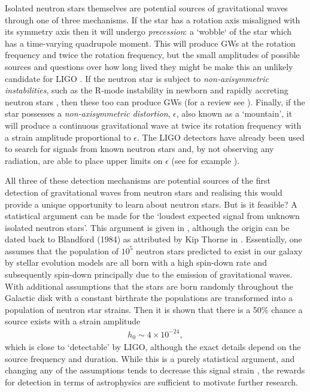 Isolated neutron stars themselves are potential sources of gravitational waves
through one of three mechanisms. If the star has a rotation axis misaligned
with its symmetry axis then it will undergo \emph{precession}: a `wobble` of
the star which has a time-varying quadrupole moment. This will produce GWs at
the rotation frequency and twice the rotation frequency, but the small
amplitudes of possible sources and questions over how long lived they might be
make this an unlikely candidate for LIGO \citep{Jones2002}. If the neutron star
is subject to \emph{non-axisymmetric instabilities}, such as the R-mode
instability in newborn and rapidly accreting neutron stars
\citep{andersson2001r}, then these too can produce GWs (for a review see
\citet{andersson2003gravitational}).  Finally, if the star possesses a
\emph{non-axisymmetric distortion}, $\epsilon$, also known as a `mountain', it
will produce a continuous gravitational wave at twice its rotation frequency
with a strain amplitude proportional to $\epsilon$. The LIGO detectors have
already been used to search for signals from known neutron stars and, by not
observing any radiation, are able to place upper limits on $\epsilon$ (see for
example \citet{ligo2008, ligo2011}).

All three of these detection mechanisms are potential sources of the first detection
of gravitational waves from neutron stars and realising this would provide a
unique opportunity to learn about neutron stars. But is it feasible? A statistical
argument can be made for the `loudest expected signal from unknown isolated
neutron stars'. This argument is given in \citet{abbott2007searches},
although the origin can be dated back to Blandford (1984) as attributed by Kip Thorne
in \citet{Hawking1989}. Essentially, one assumes that the population of $10^{5}$
neutron stars predicted to exist in our galaxy by stellar evolution models are
all born with a high spin-down rate and subsequently spin-down principally due to
the emission of gravitational waves. With additional assumptions that the stars
are born randomly throughout the Galactic disk with a constant birthrate the
populations are transformed into a population of neutron star strains. Then it
is shown that there is a 50\% chance a source exists with a strain amplitude
\begin{align}
h_0 \sim 4 \times 10^{-24},
\end{align}
which is close to `detectable' by LIGO, although the exact details depend on the
source frequency and duration. While this is a purely statistical argument, and
changing any of the assumptions tends to decrease this signal strain
\citep{Prix2009}, the rewards for detection in terms of astrophysics are
sufficient to motivate further research.

